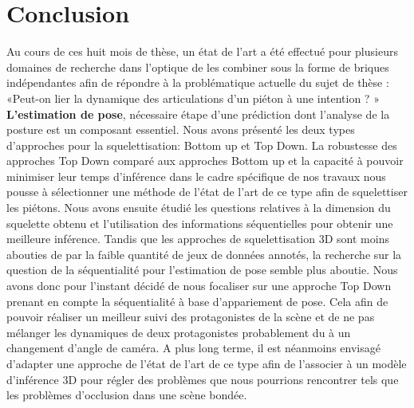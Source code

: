 \clearpage
\chapter{Conclusion}
\label{sec:SOTA}

Au cours de ces huit mois de thèse, un état de l'art a été effectué pour plusieurs domaines de recherche dans l'optique de les combiner sous la forme de briques indépendantes afin de répondre à la problématique actuelle du sujet de thèse : «Peut-on lier la dynamique des articulations d'un piéton à une intention ? »\\


\textbf{L'estimation de pose}, nécessaire étape d'une prédiction dont l'analyse de la posture est un composant essentiel. Nous avons présenté les deux types d'approches pour la squelettisation: Bottom up et Top Down. La robustesse des approches Top Down comparé aux approches Bottom up et la capacité à pouvoir minimiser leur temps d'inférence dans le cadre spécifique de nos travaux nous pousse à sélectionner une méthode de l'état de l'art de ce type afin de squelettiser les piétons. Nous avons ensuite étudié les questions relatives à la dimension du squelette obtenu et l'utilisation des informations séquentielles pour obtenir une meilleure inférence. Tandis que les approches de squelettisation 3D sont moins abouties de par la faible quantité de jeux de données annotés, la recherche sur la question de la séquentialité pour l'estimation de pose semble plus aboutie. Nous avons donc pour l'instant décidé de nous focaliser sur une approche Top Down prenant en compte la séquentialité à base d'appariement de pose. Cela afin de pouvoir réaliser un meilleur suivi des protagonistes de la scène et de ne pas mélanger les dynamiques de deux protagonistes probablement du à un changement d'angle de caméra. A plus long terme, il est néanmoins envisagé d'adapter une approche de l'état de l'art de ce type afin de l'associer à un modèle d'inférence 3D pour régler des problèmes que nous pourrions rencontrer tels que les problèmes d'occlusion dans une scène bondée.   \\


